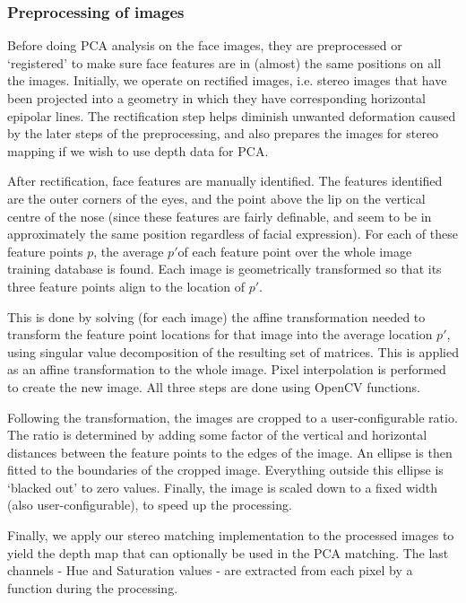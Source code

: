 \subsubsection{Preprocessing of images}
\label{sec:preprocess}

Before doing PCA analysis on the face images, they are preprocessed or `registered' to make sure
face features are in (almost) the same positions on all the images. Initially, we operate on rectified images, i.e. stereo images that have
been projected into a geometry in which they have corresponding horizontal epipolar lines. The
rectification step helps diminish unwanted deformation caused by the later steps of the
preprocessing, and also prepares the images for stereo mapping if we wish to use depth data for PCA.

After rectification, face features are manually identified. The features
identified are the outer corners of the eyes, and the point above the lip on the vertical centre of the nose 
(since these features are fairly definable, and seem to be in approximately the same position regardless
of facial expression). For each of these feature points $p$, the average $p'$of each feature point over the whole image
training database is found. Each image is geometrically transformed so that its three feature points align to the location of $p'$.

This is done by solving (for each image) the affine transformation needed to transform the feature point
locations for that image into the average location $p'$, using singular value
decomposition of the resulting set of matrices. This is applied as an affine
transformation to the whole image. Pixel interpolation is performed to create the new image. All three steps are done using OpenCV functions.

Following the transformation, the images are cropped to a user-configurable
ratio. The ratio is determined by adding some factor of the vertical and horizontal distances
between the feature points to the edges of the image. An ellipse is then fitted to the boundaries of the cropped image. Everything outside this ellipse is
`blacked out' to zero values. Finally, the image is scaled down to a fixed width (also
user-configurable), to speed up the processing.

Finally, we apply our stereo matching implementation to the processed images to
yield the depth map that can optionally be used in the PCA matching. The last channels - Hue and Saturation values - are extracted from each pixel by a function during the processing.

